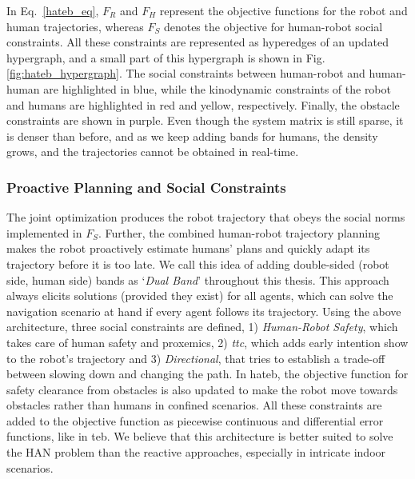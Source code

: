 In Eq.~\ref{hateb_eq}, $F_R$ and $F_H$ represent the objective functions for the robot and human trajectories, whereas $F_S$ denotes the objective for human-robot social constraints. All these constraints are represented as hyperedges of an updated hypergraph, and a small part of this hypergraph is shown in Fig. \ref{fig:hateb_hypergraph}. The social constraints between human-robot and human-human are highlighted in blue, while the kinodynamic constraints of the robot and humans are highlighted in red and yellow, respectively. Finally, the obstacle constraints are shown in purple. Even though the system matrix is still sparse, it is denser than before, and as we keep adding bands for humans, the density grows, and the trajectories cannot be obtained in real-time. 

\subsubsection{Proactive Planning and Social Constraints}
The joint optimization produces the robot trajectory that obeys the social norms implemented in $F_S$. Further, the combined human-robot trajectory planning makes the robot proactively estimate humans' plans and quickly adapt its trajectory before it is too late. We call this idea of adding double-sided (robot side, human side) bands as `{\textit{Dual Band}}' throughout this thesis. This approach always elicits solutions (provided they exist) for all agents, which can solve the navigation scenario at hand if every agent follows its trajectory. 
Using the above architecture, three social constraints are defined, 1) \textit{Human-Robot Safety}, which takes care of human safety and proxemics, 2) \textit{\acrfull{ttc}}, which adds early intention show to the robot's trajectory and 3) \textit{Directional}, that tries to establish a trade-off between slowing down and changing the path. In \acrshort{hateb}, the objective function for safety clearance from obstacles is also updated to make the robot move towards obstacles rather than humans in confined scenarios. All these constraints are added to the objective function as piecewise continuous and differential error functions, like in \acrshort{teb}. We believe that this architecture is better suited to solve the HAN problem than the reactive approaches, especially in intricate indoor scenarios.

